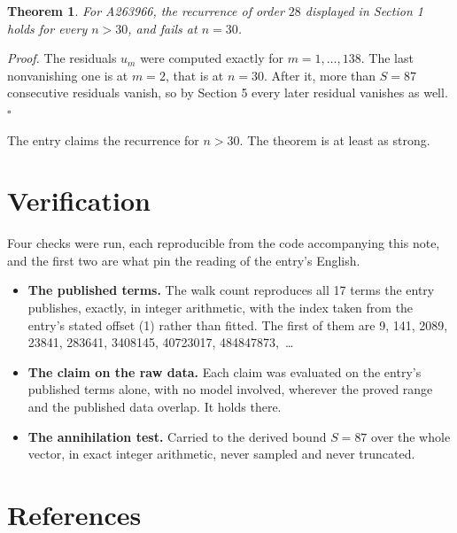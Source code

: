 \documentclass[11pt]{article}
\newtheorem{theorem}{Theorem}
\theoremstyle{definition}
\begin{document}
\begin{theorem} For A263966, the recurrence of order $28$ displayed in Section 1 holds for every $n > 30$, and fails at $n = 30$.\end{theorem}

{\itshape Proof.} The residuals $u_m$ were computed exactly for $m = 1,\dots,138$. The last nonvanishing one is at $m = 2$, that is at $n = 30$. After it, more than $S = 87$ consecutive residuals vanish, so by Section 5 every later residual vanishes as well. $\square$

The entry claims the recurrence for $n > 30$. The theorem is at least as strong.

\section{Verification}

Four checks were run, each reproducible from the code accompanying this note, and the first two are what pin the reading of the entry's English.

\begin{itemize}

\item {\bfseries The published terms.} The walk count reproduces all 17 terms the entry publishes, exactly, in integer arithmetic, with the index taken from the entry's stated offset (1) rather than fitted. The first of them are 9, 141, 2089, 23841, 283641, 3408145, 40723017, 484847873,~\dots

\item {\bfseries The claim on the raw data.} Each claim was evaluated on the entry's published terms alone, with no model involved, wherever the proved range and the published data overlap. It holds there.

\item {\bfseries The annihilation test.} Carried to the derived bound $S = 87$ over the whole vector, in exact integer arithmetic, never sampled and never truncated.

\end{itemize}

\section{References}
\end{document}
